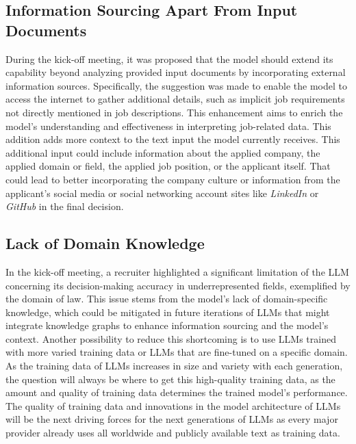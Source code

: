 \documentclass[draft,final]{thesisclass} %
\begin{document}
\subsection{Information Sourcing Apart From Input Documents} \label{interpretation_sourcing_from_internet}
During the kick-off meeting, it was proposed that the model should extend its capability beyond analyzing provided input documents by incorporating external information sources. Specifically, the suggestion was made to enable the model to access the internet to gather additional details, such as implicit job requirements not directly mentioned in job descriptions. This enhancement aims to enrich the model's understanding and effectiveness in interpreting job-related data. This addition adds more context to the text input the model currently receives. This additional input could include information about the applied company, the applied domain or field, the applied job position, or the applicant itself. That could lead to better incorporating the company culture or information from the applicant's social media or social networking account sites like \textit{LinkedIn} or \textit{GitHub} in the final decision.

\subsection{Lack of Domain Knowledge}
In the kick-off meeting, a recruiter highlighted a significant limitation of the \gls{LLM} concerning its decision-making accuracy in underrepresented fields, exemplified by the domain of law. This issue stems from the model's lack of domain-specific knowledge, which could be mitigated in future iterations of \gls{LLM}s that might integrate knowledge graphs to enhance information sourcing and the model's context. Another possibility to reduce this shortcoming is to use \gls{LLM}s trained with more varied training data or \gls{LLM}s that are fine-tuned on a specific domain. As the training data of \gls{LLM}s increases in size and variety with each generation, the question will always be where to get this high-quality training data, as the amount and quality of training data determines the trained model's performance. The quality of training data and innovations in the model architecture of \gls{LLM}s will be the next driving forces for the next generations of \gls{LLM}s as every major provider already uses all worldwide and publicly available text as training data.
\end{document}
